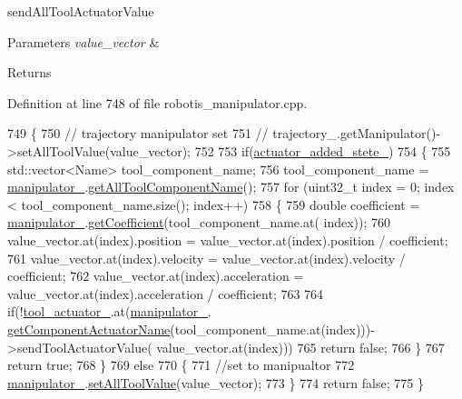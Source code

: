 send\+All\+Tool\+Actuator\+Value 


\begin{DoxyParams}{Parameters}
{\em value\+\_\+vector} & \\
\hline
\end{DoxyParams}
\begin{DoxyReturn}{Returns}

\end{DoxyReturn}


Definition at line 748 of file robotis\+\_\+manipulator.\+cpp.


\begin{DoxyCode}
749 \{
750   \textcolor{comment}{// trajectory manipulator set}
751   \textcolor{comment}{// trajectory\_.getManipulator()->setAllToolValue(value\_vector);}
752 
753   \textcolor{keywordflow}{if}(\hyperlink{classrobotis__manipulator_1_1_robotis_manipulator_a02073b7982b992642b28acfa35a17769}{actuator\_added\_stete\_})
754   \{
755     std::vector<Name> tool\_component\_name;
756     tool\_component\_name = \hyperlink{classrobotis__manipulator_1_1_robotis_manipulator_a5b2df4a3b3ee7f408cb1d0eaf61644dc}{manipulator\_}.\hyperlink{classrobotis__manipulator_1_1_manipulator_a53cf6f3195057072869795ebac3b8dce}{getAllToolComponentName}();
757     \textcolor{keywordflow}{for} (uint32\_t index = 0; index < tool\_component\_name.size(); index++)
758     \{
759       \textcolor{keywordtype}{double} coefficient = \hyperlink{classrobotis__manipulator_1_1_robotis_manipulator_a5b2df4a3b3ee7f408cb1d0eaf61644dc}{manipulator\_}.\hyperlink{classrobotis__manipulator_1_1_manipulator_a437ac5f137aa788c4db07690c185e9ba}{getCoefficient}(tool\_component\_name.at(
      index));
760       value\_vector.at(index).position = value\_vector.at(index).position / coefficient;
761       value\_vector.at(index).velocity = value\_vector.at(index).velocity / coefficient;
762       value\_vector.at(index).acceleration = value\_vector.at(index).acceleration / coefficient;
763 
764       \textcolor{keywordflow}{if}(!\hyperlink{classrobotis__manipulator_1_1_robotis_manipulator_a9d472875a989092466257d14dff2bdcf}{tool\_actuator\_}.at(\hyperlink{classrobotis__manipulator_1_1_robotis_manipulator_a5b2df4a3b3ee7f408cb1d0eaf61644dc}{manipulator\_}.
      \hyperlink{classrobotis__manipulator_1_1_manipulator_a371446cbf4d2d5a572b173d713305fb1}{getComponentActuatorName}(tool\_component\_name.at(index)))->sendToolActuatorValue(
      value\_vector.at(index)))
765         \textcolor{keywordflow}{return} \textcolor{keyword}{false};
766     \}
767     \textcolor{keywordflow}{return} \textcolor{keyword}{true};
768   \}
769   \textcolor{keywordflow}{else}
770   \{
771     \textcolor{comment}{//set to manipualtor}
772     \hyperlink{classrobotis__manipulator_1_1_robotis_manipulator_a5b2df4a3b3ee7f408cb1d0eaf61644dc}{manipulator\_}.\hyperlink{classrobotis__manipulator_1_1_manipulator_aea664539cecc8a68c7d58ccbf9760787}{setAllToolValue}(value\_vector);
773   \}
774   \textcolor{keywordflow}{return} \textcolor{keyword}{false};
775 \}
\end{DoxyCode}


